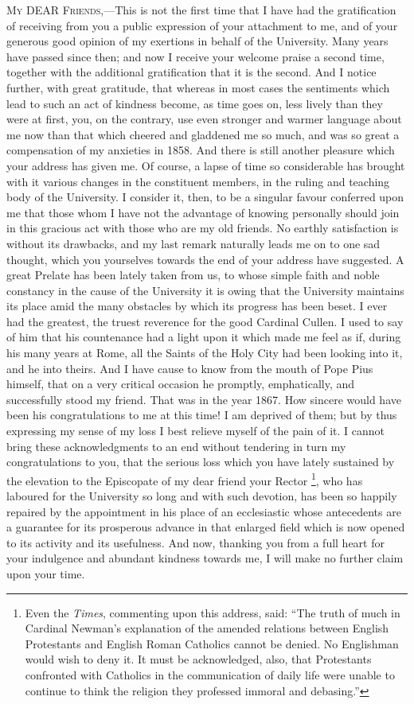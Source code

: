 M\textsc{y} DEAR
F\textsc{riends},—This is not the first time that I
have had the gratification of receiving from you a public expression
of your attachment to me, and of your generous good opinion of my
exertions in behalf of the University. Many years have passed since
then; and now I receive your welcome praise a second time, together
with the additional gratification that it is the second. And I notice
further, with great gratitude, that whereas in most cases the
sentiments which lead to such an act of kindness become, as time goes
on, less lively than they were at first, you, on the contrary, use
even stronger and warmer language about me now than that which cheered
and gladdened me so much, and was so great a compensation of my
anxieties in 1858. And there is still another pleasure which your
address has given me. Of course, a lapse of time so considerable has
brought with it various changes in the constituent members, in the ruling and teaching body of the University. I consider it, then,
to be a singular favour conferred upon me that those whom I have not
the advantage of knowing personally should join in this gracious act
with those who are my old friends. No earthly satisfaction is without
its drawbacks, and my last remark naturally leads me on to one sad
thought, which you yourselves towards the end of your address have
suggested. A great Prelate has been lately taken from us, to whose
simple faith and noble constancy in the cause of the University it is
owing that the University maintains its place amid the many obstacles
by which its progress has been beset. I ever had the greatest, the
truest reverence for the good Cardinal Cullen. I used to say of him
that his countenance had a light upon it which made me feel as if,
during his many years at Rome, all the Saints of the Holy City had
been looking into it, and he into theirs. And I have cause to know
from the mouth of Pope Pius himself, that on a very critical occasion
he promptly, emphatically, and successfully stood my friend. That was
in the year 1867. How sincere would have been his congratulations to
me at this time! I am deprived of them; but by thus expressing my
sense of my loss I best relieve myself of the pain of it. I cannot
bring these acknowledgments to an end without tendering in turn my
congratulations to you, that the serious loss which you have lately
sustained by the elevation to the Episcopate of my dear friend your
Rector \footnote{Even the \emph{Times}, commenting upon this address, said: ``The truth
of much in Cardinal Newman's explanation of the amended relations
between English Protestants and English Roman Catholics cannot be
denied. No Englishman would wish to deny it. It must be acknowledged,
also, that Protestants confronted with Catholics in the communication
of daily life were unable to continue to think the religion they
professed immoral and debasing.''}, who has laboured
for the University so long and with such devotion, has been so happily
repaired by the appointment in his place of an ecclesiastic whose
antecedents are a guarantee for its prosperous advance in that
enlarged field which is now opened to its activity and its usefulness.
And now, thanking you from a full heart for your indulgence and
abundant kindness towards me, I will make no further claim upon your
time.

